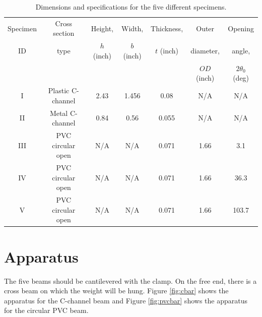 \documentclass[12 pt]{report}
\begin{document}
\begin{table}[!htbp]
\caption{Dimensions and specifications for the five different specimens.}
\begin{center}
	\begin{tabular}{|c|c|c|c|c|c|c|}
		\hline
		Specimen &Cross section &Height, &Width, &Thickness, &Outer &Opening \\
		ID&type&$h$ (\unit{inch})&$b$ (\unit{inch})&$t$ (\unit{inch})&diameter, &angle, \\
		&&&&&$OD$ (\unit{inch})&$2\theta_0$ (\unit{deg})\\
		\hline
		I&Plastic C-channel&2.43&1.456&0.08&N/A&N/A\\
		\hline
		II&Metal C-channel&0.84&0.56&0.055&N/A&N/A\\
		\hline
		III&PVC circular open&N/A&N/A&0.071&1.66&3.1\\
		\hline
		IV&PVC circular open&N/A&N/A&0.071&1.66&36.3\\
		\hline
		V&PVC circular open&N/A&N/A&0.071&1.66&103.7\\
		\hline
	\end{tabular}
\end{center}
\label{tbl:specimens}
\end{table}

\section{Apparatus} \label{apparatus}
The five beams should be cantilevered with the clamp. On the free end, there is a cross beam on which the weight will be hung. Figure \ref{fig:cbar} shows the apparatus for the C-channel beam and Figure \ref{fig:pvcbar} shows the apparatus for the circular PVC beam.
\end{document}
